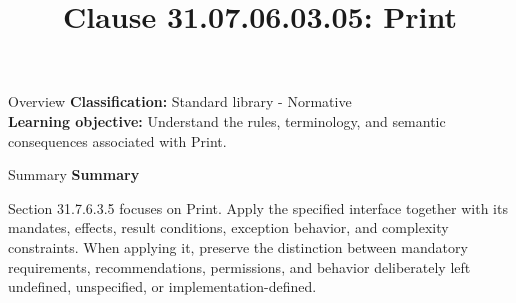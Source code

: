 \documentclass[10pt,letterpaper]{article}
\title{Clause 31.07.06.03.05: Print}
\author{}
\date{}
\begin{document}
\maketitle
\begin{CornellOverviewBox}{Overview}
\textbf{Classification:} Standard library - Normative\\[2pt]
\textbf{Learning objective:} Understand the rules, terminology, and semantic consequences associated with Print.
\end{CornellOverviewBox}\begin{CornellSummaryBox}{Summary}
{\sffamily\bfseries\color{Accent} Summary}\par\vspace{3pt}Section 31.7.6.3.5 focuses on Print. Apply the specified interface together with its mandates, effects, result conditions, exception behavior, and complexity constraints. When applying it, preserve the distinction between mandatory requirements, recommendations, permissions, and behavior deliberately left undefined, unspecified, or implementation-defined.
\end{CornellSummaryBox}
\end{document}
